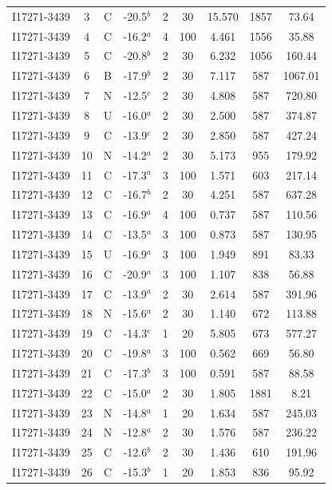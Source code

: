 \begin{table}
\begin{tabular}{ccccccccc}
I17271-3439 & 3 & C & -20.5$^{b}$ & 2 & 30 & 15.570 & 1857 & 73.64 \\
I17271-3439 & 4 & C & -16.2$^{a}$ & 4 & 100 & 4.461 & 1556 & 35.88 \\
I17271-3439 & 5 & C & -20.8$^{b}$ & 2 & 30 & 6.232 & 1056 & 160.44 \\
I17271-3439 & 6 & B & -17.9$^{b}$ & 2 & 30 & 7.117 & 587 & 1067.01 \\
I17271-3439 & 7 & N & -12.5$^{c}$ & 2 & 30 & 4.808 & 587 & 720.80 \\
I17271-3439 & 8 & U & -16.0$^{a}$ & 2 & 30 & 2.500 & 587 & 374.87 \\
I17271-3439 & 9 & C & -13.9$^{c}$ & 2 & 30 & 2.850 & 587 & 427.24 \\
I17271-3439 & 10 & N & -14.2$^{a}$ & 2 & 30 & 5.173 & 955 & 179.92 \\
I17271-3439 & 11 & C & -17.3$^{a}$ & 3 & 100 & 1.571 & 603 & 217.14 \\
I17271-3439 & 12 & C & -16.7$^{b}$ & 2 & 30 & 4.251 & 587 & 637.28 \\
I17271-3439 & 13 & C & -16.9$^{a}$ & 4 & 100 & 0.737 & 587 & 110.56 \\
I17271-3439 & 14 & C & -13.5$^{a}$ & 3 & 100 & 0.873 & 587 & 130.95 \\
I17271-3439 & 15 & U & -16.9$^{a}$ & 3 & 100 & 1.949 & 891 & 83.33 \\
I17271-3439 & 16 & C & -20.9$^{a}$ & 3 & 100 & 1.107 & 838 & 56.88 \\
I17271-3439 & 17 & C & -13.9$^{a}$ & 2 & 30 & 2.614 & 587 & 391.96 \\
I17271-3439 & 18 & N & -15.6$^{a}$ & 2 & 30 & 1.140 & 672 & 113.88 \\
I17271-3439 & 19 & C & -14.3$^{c}$ & 1 & 20 & 5.805 & 673 & 577.27 \\
I17271-3439 & 20 & C & -19.8$^{a}$ & 3 & 100 & 0.562 & 669 & 56.80 \\
I17271-3439 & 21 & C & -17.3$^{b}$ & 3 & 100 & 0.591 & 587 & 88.58 \\
I17271-3439 & 22 & C & -15.0$^{a}$ & 2 & 30 & 1.805 & 1881 & 8.21 \\
I17271-3439 & 23 & N & -14.8$^{a}$ & 1 & 20 & 1.634 & 587 & 245.03 \\
I17271-3439 & 24 & N & -12.8$^{a}$ & 2 & 30 & 1.576 & 587 & 236.22 \\
I17271-3439 & 25 & C & -12.6$^{b}$ & 2 & 30 & 1.436 & 610 & 191.96 \\
I17271-3439 & 26 & C & -15.3$^{b}$ & 1 & 20 & 1.853 & 836 & 95.92 \\

\end{tabular}
\end{table}
